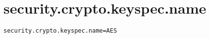 \section{security.crypto.keyspec.name}
\label{configuration:SecurityCryptoKeyspecName}
\AvailableInJavaOnly{\TODO}
\begin{lstlisting}[style=Props,caption={Usage example for \textit{security.crypto.keyspec.name}}]
security.crypto.keyspec.name=AES
\end{lstlisting}